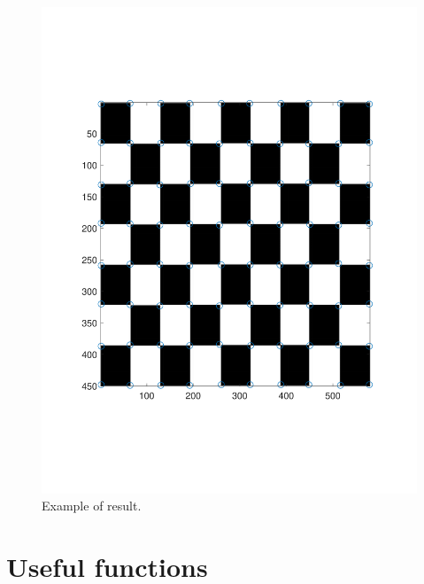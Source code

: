 \documentclass[a4paper]{article}
\begin{document}
\begin{figure}[!b]
\centering
\includegraphics[scale=0.3]{figures/harris}
\caption{Example of result.}
\end{figure}

\section{Useful functions}





 
 

\end{document}
